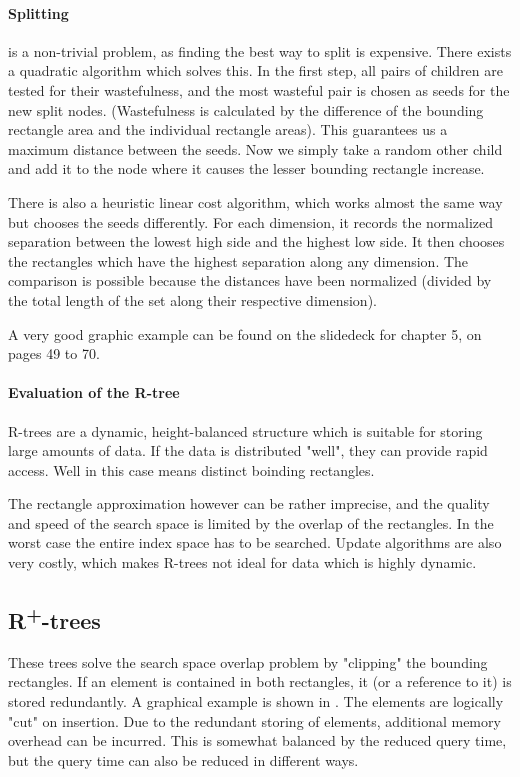\documentclass{article}
\begin{document}
\paragraph{Splitting} is a non-trivial problem, as finding the best way to split is expensive.
There exists a quadratic algorithm which solves this.
In the first step, all pairs of children are tested for their wastefulness, and the most wasteful pair is chosen as seeds for the new split nodes.
(Wastefulness is calculated by the difference of the bounding rectangle area and the individual rectangle areas).
This guarantees us a maximum distance between the seeds.
Now we simply take a random other child and add it to the node where it causes the lesser bounding rectangle increase.

There is also a heuristic linear cost algorithm, which works almost the same way but chooses the seeds differently.
For each dimension, it records the normalized separation between the lowest high side and the highest low side.
It then chooses the rectangles which have the highest separation along any dimension.
The comparison is possible because the distances have been normalized (divided by the total length of the set along their respective dimension).

A very good graphic example can be found on the slidedeck for chapter 5, on pages 49 to 70.

\paragraph{Evaluation of the R-tree}
R-trees are a dynamic, height-balanced structure which is suitable for storing large amounts of data.
If the data is distributed "well", they can provide rapid access.
Well in this case means distinct boinding rectangles.

The rectangle approximation however can be rather imprecise, and the quality and speed of the search space is limited by the overlap of the rectangles.
In the worst case the entire index space has to be searched.
Update algorithms are also very costly, which makes R-trees not ideal for data which is highly dynamic.

\subsection{R\textsuperscript{+}-trees}
These trees solve the search space overlap problem by "clipping" the bounding rectangles.
If an element is contained in both rectangles, it (or a reference to it) is stored redundantly.
A graphical example is shown in . 
The elements are logically "cut" on insertion.
Due to the redundant storing of elements, additional memory overhead can be incurred.
This is somewhat balanced by the reduced query time, but the query time can also be reduced in different ways.
\end{document}
